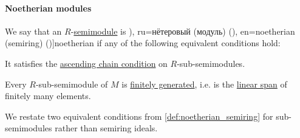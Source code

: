 \paragraph{Noetherian modules}

\begin{definition}\label{def:noetherian_semimodule}\mimprovised
  We say that an \( R \)-\hyperref[def:semimodule]{semimodule} is \term[bg=ньотеров (модул) (\cite[41]{КоцевСидеров2016КомутативнаАлгебра}), ru=нётеровый (модуль) (\cite[def. 9.4.1]{Винберг2014КурсАлгебры}), en=noetherian (semiring) (\cite[prop. 6.16]{Golan1999Semirings})]{noetherian} if any of the following equivalent conditions hold:
  \begin{thmenum}
     It satisfies the \hyperref[def:chain_condition]{ascending chain condition} on \( R \)-sub-semimodules.

     Every \( R \)-sub-semimodule of \( M \) is \hyperref[def:semimodule/generated]{finitely generated}, i.e. is the \hyperref[def:semimodule/subobject]{linear span} of finitely many elements.
  \end{thmenum}
\end{definition}
\begin{comments}
  \item We restate two equivalent conditions from \cref{def:noetherian_semiring} for sub-semimodules rather than semiring ideals.
\end{comments}
